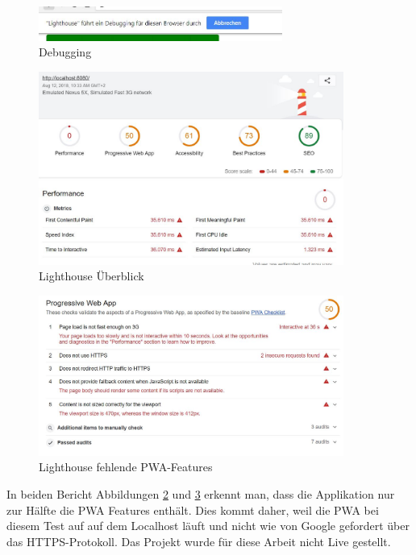\begin{figure}[h]
	\centering
	\includegraphics[width=8cm]{BilderAllgemein/Test/debuggingLighthouse}\medskip
	\caption{Debugging}
	\label{fig:LighthouseDebugging}
\end{figure}
 

\begin{figure}[H]
	\centering
	\includegraphics[width=10cm]{BilderAllgemein/Test/LightH_beforHTTPS_Overview}\medskip
	\caption{Lighthouse Überblick}
	\label{fig:LightH_beforHTTPS_Overview}
\end{figure}

\begin{figure}[h]
	\centering
	\includegraphics[width=10cm]{BilderAllgemein/Test/PWA_Test_Lighthouse_noHTTPS}\medskip
	\caption{Lighthouse fehlende PWA-Features}
	\label{fig:PWA_Test_Lighthouse_noHTTPS}
\end{figure}

In beiden Bericht Abbildungen \ref{fig:LightH_beforHTTPS_Overview} und \ref{fig:PWA_Test_Lighthouse_noHTTPS} erkennt man, dass die Applikation nur zur Hälfte die PWA Features enthält.
Dies kommt daher, weil die \acs{PWA} bei diesem Test auf auf dem Localhost läuft und nicht wie von Google gefordert über das HTTPS-Protokoll.
Das Projekt wurde für diese Arbeit nicht Live gestellt.


